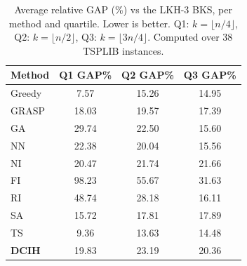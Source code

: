 \begin{table}[htbp]
\centering
\caption{Average relative GAP (\%) vs the LKH-3 BKS, per method and quartile. Lower is better. Q1: $k=\lfloor n/4\rfloor$, Q2: $k=\lfloor n/2\rfloor$, Q3: $k=\lfloor 3n/4\rfloor$. Computed over 38 TSPLIB instances.}
\label{tab:resumen_gap}
\begin{tabular}{|l|c|c|c|}
\hline
\textbf{Method} & \textbf{Q1 GAP\%} & \textbf{Q2 GAP\%} & \textbf{Q3 GAP\%} \\
\hline
Greedy & 7.57 & 15.26 & 14.95 \\
GRASP & 18.03 & 19.57 & 17.39 \\
GA & 29.74 & 22.50 & 15.60 \\
NN & 22.38 & 20.04 & 15.56 \\
NI & 20.47 & 21.74 & 21.66 \\
FI & 98.23 & 55.67 & 31.63 \\
RI & 48.74 & 28.18 & 16.11 \\
SA & 15.72 & 17.81 & 17.89 \\
TS & 9.36 & 13.63 & 14.48 \\
\textbf{DCIH} & 19.83 & 23.19 & 20.36 \\
\hline
\end{tabular}
\end{table}
